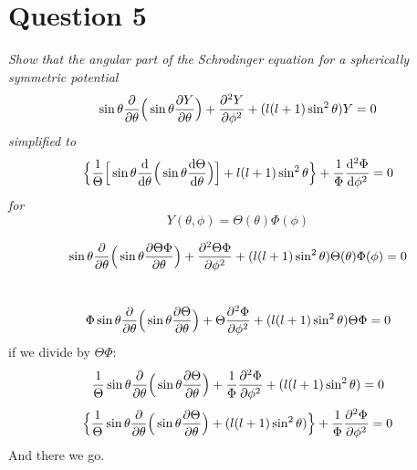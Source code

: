 \documentclass[12pt]{article}
\begin{document}
\section*{Question 5}
\emph{Show that the angular part of the Schrodinger equation for a spherically symmetric potential}
\[\sin\theta \pdv{\theta}\Big(\sin\theta\pdv{Y}{\theta}\Big) + \pdv[2]{Y}{\phi} + (l(l+1)\sin^2 \theta )Y = 0\]
\emph{simplified to}
\[\Big\{\frac{1}{\Theta}\Big[\sin \theta \dv{\theta}\Big(\sin \theta \dv{\Theta}{\theta}\Big)\Big] + l(l+1)\sin^2 \theta\Big\} + \frac{1}{\Phi}\dv[2]{\Phi}{\phi} = 0\]
\emph{for}
\[Y(\theta, \phi) = \Theta(\theta)\Phi(\phi)\]\bigskip


\[\sin\theta \pdv{\theta}\Big(\sin\theta\pdv{\Theta\Phi}{\theta}\Big) + \pdv[2]{\Theta\Phi}{\phi} + (l(l+1)\sin^2 \theta ) \Theta(\theta)\Phi(\phi) = 0\]\
\[\Phi\sin\theta \pdv{\theta}\Big(\sin\theta\pdv{\Theta}{\theta}\Big) + \Theta\pdv[2]{\Phi}{\phi} + (l(l+1)\sin^2 \theta )\Theta \Phi = 0\]
if we divide by $\Theta\Phi$:
\[\frac{1}{\Theta}\sin\theta \pdv{\theta}\Big(\sin\theta\pdv{\Theta}{\theta}\Big) + \frac{1}{\Phi}\pdv[2]{\Phi}{\phi} + (l(l+1)\sin^2 \theta ) = 0\]
\[\Big\{\frac{1}{\Theta}\sin\theta \pdv{\theta}\Big(\sin\theta\pdv{\Theta}{\theta}\Big) + (l(l+1)\sin^2 \theta ) \Big\} + \frac{1}{\Phi}\pdv[2]{\Phi}{\phi}  = 0\]
And there we go. 
\end{document}
